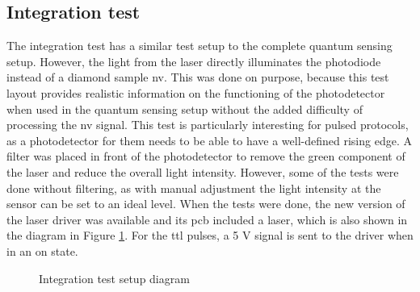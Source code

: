 \subsection{Integration test}
The integration test has a similar test setup to the complete quantum sensing setup. However, the light from the laser directly illuminates the photodiode instead of a diamond sample \gls{nv}. This was done on purpose, because this test layout provides realistic information on the functioning of the photodetector when used in the quantum sensing setup without the added difficulty of processing the \gls{nv} signal. This test is particularly interesting for pulsed protocols, as a photodetector for them needs to be able to have a well-defined rising edge. A filter was placed in front of the photodetector to remove the green component of the laser and reduce the overall light intensity. However, some of the tests were done without filtering, as with manual adjustment the light intensity at the sensor can be set to an ideal level. When the tests were done, the new version of the laser driver was available and its \gls{pcb} included a laser, which is also shown in the diagram in Figure \ref{fig:test:tia_integ:setup}. For the \gls{ttl} pulses, a 5 \unit{\volt} signal is sent to the driver when in an on state.  

\begin{figure}[ht]
	\centering
	\caption{Integration test setup diagram}
	\label{fig:test:tia_integ:setup}
\end{figure}

